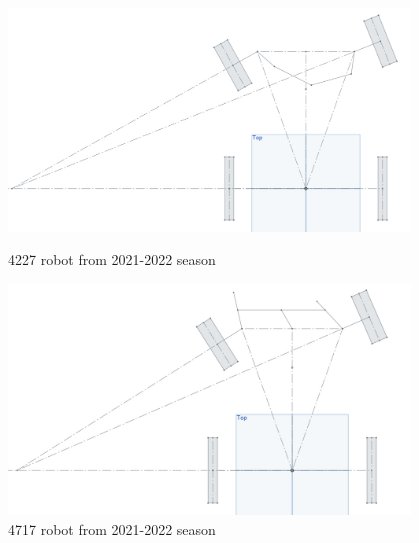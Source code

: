 \begin{figure}[ht]
\centering
\begin{minipage}[b]{.48\textwidth}
  \centering
  \includegraphics[width=0.95\textwidth]{Meetings/October/10-06-22/10-6-22_CAD_Figure4.PNG}
  \caption{4227 robot from 2021-2022 season}
  \label{fig:pic1}
\end{minipage}%
\hfill%
\begin{minipage}[b]{.48\textwidth}
  \centering
  \includegraphics[width=0.95\textwidth]{Meetings/October/10-06-22/10-6-22_CAD_Figure5.PNG}
  \caption{4717 robot from 2021-2022 season}
  \label{fig:pic2}
\end{minipage}
\end{figure}



